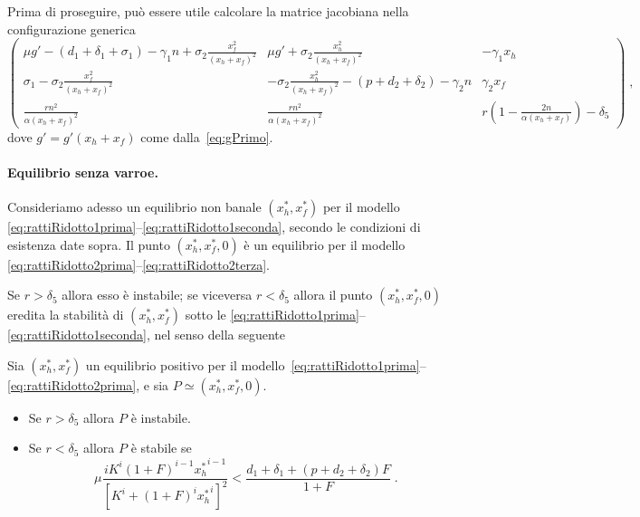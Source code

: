 Prima di proseguire, può essere utile calcolare la matrice jacobiana nella configurazione
generica
\begin{equation}
    \begin{pmatrix}
    \mu g' - (d_1 +\delta_1 +\sigma_1) -\gamma_1 n + \sigma_2 \frac{x_f^2}{(x_h+x_f)^2} &
    \mu g' + \sigma_2 \frac{x_h^2}{(x_h+x_f)^2} &
    -\gamma_1 x_h
    \\
    \sigma_1 - \sigma_2 \frac{x_f^2}{(x_h+x_f)^2} &
    - \sigma_2 \frac{x_h^2}{(x_h+x_f)^2} - ( p +d_2 +\delta_2) - \gamma_2 n &
    \gamma_2 x_f
    \\
    \frac{ r n^2 }{ \alpha (x_h + x_f)^2 } &
    \frac{ r n^2 }{ \alpha (x_h + x_f)^2 } &
    r \left(1-\frac{2n}{\alpha (x_h+x_f)} \right) -\delta_5
    \end{pmatrix}
    \; ,
\end{equation}
dove $g' = g'(x_h +x_f)$ come dalla~\eqref{eq:gPrimo}.


\paragraph{Equilibrio senza varroe. } Consideriamo adesso un equilibrio non banale $(x_h^*, x_f^*)$ per il modello \eqref{eq:rattiRidotto1prima}--\eqref{eq:rattiRidotto1seconda}, secondo le condizioni di esistenza date sopra.
Il punto $(x_h^*, x_f^*, 0)$ è un equilibrio per il modello \eqref{eq:rattiRidotto2prima}--\eqref{eq:rattiRidotto2terza}.

Se $r > \delta_5$ allora esso è instabile; se viceversa $r< \delta_5$ allora
il punto $(x_h^*, x_f^*, 0)$ eredita la stabilità di $(x_h^*, x_f^*)$ sotto le
\eqref{eq:rattiRidotto1prima}--\eqref{eq:rattiRidotto1seconda}, nel senso della seguente

\begin{proposizione}
    Sia $(x_h^*, x_f^*)$ un equilibrio positivo per
    il modello~\eqref{eq:rattiRidotto1prima}--\eqref{eq:rattiRidotto2prima}, e sia
    $P \simeq (x_h^*, x_f^*, 0)$.
    \begin{itemize}
        \item Se $r > \delta_5 $ allora $P$ è instabile.
        \item Se $r < \delta_5 $ allora $P$ è stabile se
        \begin{equation}
            \mu \frac{ i K^i (1+F)^{i-1}{x_h^*}^{i-1} }{ {\left[ K^i +(1+F)^i {x_h^*}^i \right]}^2 }
            < \frac{d_1 + \delta_1 + (p+d_2+\delta_2)F}{1+F} \; .
            \label{eq:rattiRidotto2stability}
        \end{equation}
    \end{itemize}
\end{proposizione}

